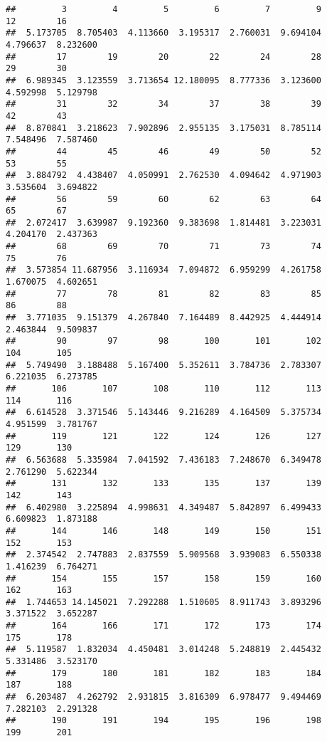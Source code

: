 \documentclass[
]{article}
\begin{document}
\begin{verbatim}
##         3         4         5         6         7         9        12        16 
##  5.173705  8.705403  4.113660  3.195317  2.760031  9.694104  4.796637  8.232600 
##        17        19        20        22        24        28        29        30 
##  6.989345  3.123559  3.713654 12.180095  8.777336  3.123600  4.592998  5.129798 
##        31        32        34        37        38        39        42        43 
##  8.870841  3.218623  7.902896  2.955135  3.175031  8.785114  7.548496  7.587460 
##        44        45        46        49        50        52        53        55 
##  3.884792  4.438407  4.050991  2.762530  4.094642  4.971903  3.535604  3.694822 
##        56        59        60        62        63        64        65        67 
##  2.072417  3.639987  9.192360  9.383698  1.814481  3.223031  4.204170  2.437363 
##        68        69        70        71        73        74        75        76 
##  3.573854 11.687956  3.116934  7.094872  6.959299  4.261758  1.670075  4.602651 
##        77        78        81        82        83        85        86        88 
##  3.771035  9.151379  4.267840  7.164489  8.442925  4.444914  2.463844  9.509837 
##        90        97        98       100       101       102       104       105 
##  5.749490  3.188488  5.167400  5.352611  3.784736  2.783307  6.221035  6.273785 
##       106       107       108       110       112       113       114       116 
##  6.614528  3.371546  5.143446  9.216289  4.164509  5.375734  4.951599  3.781767 
##       119       121       122       124       126       127       129       130 
##  6.563688  5.335984  7.041592  7.436183  7.248670  6.349478  2.761290  5.622344 
##       131       132       133       135       137       139       142       143 
##  6.402980  3.225894  4.998631  4.349487  5.842897  6.499433  6.609823  1.873188 
##       144       146       148       149       150       151       152       153 
##  2.374542  2.747883  2.837559  5.909568  3.939083  6.550338  1.416239  6.764271 
##       154       155       157       158       159       160       162       163 
##  1.744653 14.145021  7.292288  1.510605  8.911743  3.893296  3.371522  3.652287 
##       164       166       171       172       173       174       175       178 
##  5.119587  1.832034  4.450481  3.014248  5.248819  2.445432  5.331486  3.523170 
##       179       180       181       182       183       184       187       188 
##  6.203487  4.262792  2.931815  3.816309  6.978477  9.494469  7.282103  2.291328 
##       190       191       194       195       196       198       199       201 

\end{verbatim}
\end{document}
